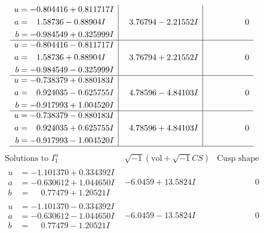 \documentclass[1p]{elsarticle_modified}
\theoremstyle{definition}
\newcommand{\I}{\sqrt{-1}}
\begin{document}
$$\begin{array}{c|c|c}
\begin{aligned}
u &= -0.804416 + 0.811717 I \\
a &= \phantom{-}1.58736 - 0.88904 I \\
b &= -0.984549 + 0.325999 I\end{aligned}
 & \phantom{-}3.76794 - 2.21552 I & \phantom{-0.000000 } 0 \\ \hline\begin{aligned}
u &= -0.804416 - 0.811717 I \\
a &= \phantom{-}1.58736 + 0.88904 I \\
b &= -0.984549 - 0.325999 I\end{aligned}
 & \phantom{-}3.76794 + 2.21552 I & \phantom{-0.000000 } 0 \\ \hline\begin{aligned}
u &= -0.738379 + 0.880183 I \\
a &= \phantom{-}0.924035 - 0.625755 I \\
b &= -0.917993 + 1.004520 I\end{aligned}
 & \phantom{-}4.78596 - 4.84103 I & \phantom{-0.000000 } 0 \\ \hline\begin{aligned}
u &= -0.738379 - 0.880183 I \\
a &= \phantom{-}0.924035 + 0.625755 I \\
b &= -0.917993 - 1.004520 I\end{aligned}
 & \phantom{-}4.78596 + 4.84103 I & \phantom{-0.000000 } 0\\
 \hline 
 \end{array}$$\newpage$$\begin{array}{c|c|c}  
\text{Solutions to }I^u_{1}& \I (\text{vol} + \sqrt{-1}CS) & \text{Cusp shape}\\
 \hline 
\begin{aligned}
u &= -1.101370 + 0.334392 I \\
a &= -0.630612 + 1.044650 I \\
b &= \phantom{-}0.77479 + 1.20521 I\end{aligned}
 & -6.0459 + 13.5824 I & \phantom{-0.000000 } 0 \\ \hline\begin{aligned}
u &= -1.101370 - 0.334392 I \\
a &= -0.630612 - 1.044650 I \\
b &= \phantom{-}0.77479 - 1.20521 I\end{aligned}
 & -6.0459 - 13.5824 I & \phantom{-0.000000 } 0 \\ \hline\begin{aligned}

\end{aligned}
\end{array}$$
\end{document}
